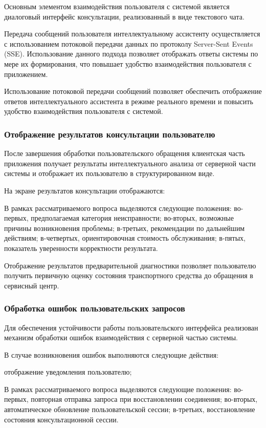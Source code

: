 \documentclass[14pt,a4paper]{extarticle}
\numberwithin{figure}{section}
\numberwithin{table}{section}
\begin{document}
Основным элементом взаимодействия пользователя с системой является
диалоговый интерфейс консультации, реализованный в виде текстового чата.

Передача сообщений пользователя интеллектуальному ассистенту
осуществляется с использованием потоковой передачи данных по протоколу
Server-Sent Events (SSE). Использование данного подхода позволяет
отображать ответы системы по мере их формирования, что повышает удобство
взаимодействия пользователя с приложением.

Использование потоковой передачи сообщений позволяет обеспечить
отображение ответов интеллектуального ассистента в режиме реального
времени и повысить удобство взаимодействия пользователя с системой.

\subsubsection{Отображение результатов консультации пользователю}

После завершения обработки пользовательского обращения клиентская часть
приложения получает результаты интеллектуального анализа от серверной
части системы и отображает их пользователю в структурированном виде.

На экране результатов консультации отображаются:


В рамках рассматриваемого вопроса выделяются следующие положения: во-первых, предполагаемая категория неисправности; во-вторых, возможные причины возникновения проблемы; в-третьих, рекомендации по дальнейшим действиям; в-четвертых, ориентировочная стоимость обслуживания; в-пятых, показатель уверенности корректности результата.


Отображение результатов предварительной диагностики позволяет
пользователю получить первичную оценку состояния транспортного средства
до обращения в сервисный центр.

\subsubsection{Обработка ошибок пользовательских запросов}

Для обеспечения устойчивости работы пользовательского интерфейса
реализован механизм обработки ошибок взаимодействия с серверной частью
системы.

В случае возникновения ошибок выполняются следующие действия:

отображение уведомления пользователю;


В рамках рассматриваемого вопроса выделяются следующие положения: во-первых, повторная отправка запроса при восстановлении соединения; во-вторых, автоматическое обновление пользовательской сессии; в-третьих, восстановление состояния консультационной сессии.
\end{document}
